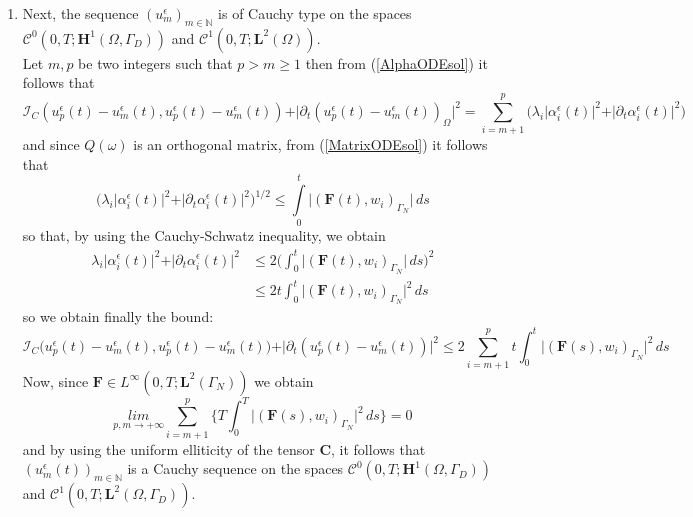 \begin{enumerate}
    \item Next, the sequence $(u^{\epsilon}_m)_{m \in \mathbb{N}}$ is of Cauchy type on the spaces $\mathcal{C}^0(0,T;\mathbf{H}^1(\Omega, \Gamma_D))$ and $\mathcal{C}^1(0,T; \mathbf{L}^2(\Omega))$.\\
    Let $m,p$ be two integers such that $p > m \geq 1$ then from (\ref{AlphaODEsol}) it follows that
    \begin{equation*}
        \mathcal{I}_C(u_p^{\epsilon}(t)- u_m^{\epsilon}(t),u_p^{\epsilon}(t)- u_m^{\epsilon}(t)) + \vert \partial_t (u_p^{\epsilon}(t)- u_m^{\epsilon}(t))_{\Omega} \vert^2 = \sum_{i=m+1}^p \big( \lambda_i \vert \alpha_i^{\epsilon}(t) \vert^2 + \vert \partial_t \alpha_i^{\epsilon}(t) \vert^2 \big) 
    \end{equation*}
    and since $Q(\omega)$ is an orthogonal matrix, from (\ref{MatrixODEsol}) it follows that
    \begin{equation}
        \label{AlphaBound}
        \big( \lambda_i \vert \alpha_i^{\epsilon}(t) \vert^2 + \vert \partial_t \alpha_i^{\epsilon}(t) \vert^2 \big)^{1/2} \leq \int \limits_0^t \vert (\mathbf{F}(t),w_i)_{\Gamma_N} \vert \, ds 
    \end{equation}
    so that, by using the Cauchy-Schwatz inequality, we obtain
    \begin{align*}
        \lambda_i \vert \alpha_i^{\epsilon}(t) \vert^2 + \vert \partial_t \alpha_i^{\epsilon}(t) \vert^2 &\leq 2 \big( \int_0^t \vert (\mathbf{F}(t),w_i)_{\Gamma_N} \vert \, ds \big)^2 \\
        & \leq  2 t \int_0^t \vert (\mathbf{F}(t),w_i)_{\Gamma_N} \vert^2 \, ds
    \end{align*}
    so we obtain finally the bound:
    \begin{equation*}
        \mathcal{I}_C \big(u_p^{\epsilon}(t) - u_m^{\epsilon}(t),u_p^{\epsilon}(t) - u_m^{\epsilon}(t) \big) + \vert \partial_t (u_p^{\epsilon}(t) - u_m^{\epsilon}(t)) \vert^2 \leq 2 \sum_{i=m+1}^p t \int_0^t \vert (\mathbf{F}(s),w_i)_{\Gamma_N} \vert^2 \, ds
    \end{equation*}
    Now, since $\mathbf{F} \in L^{\infty}(0,T;\mathbf{L}^2( \Gamma_N))$ we obtain
    \begin{equation*}
        \underset{p,m \longrightarrow + \infty}{lim} \sum_{i=m+1}^p \big \{ T \int_0^T \vert (\mathbf{F}(s),w_i)_{\Gamma_N}\vert^2 \, ds \big \} = 0
    \end{equation*}
    and by using the uniform elliticity of the tensor $\mathbf{C}$, it follows that $(u_m^{\epsilon}(t))_{m \in \mathbb{N}}$ is a Cauchy sequence on the spaces $\mathcal{C}^0(0,T; \mathbf{H}^1(\Omega, \Gamma_D))$ and $\mathcal{C}^1(0,T; \mathbf{L}^2(\Omega, \Gamma_D))$.
    

\end{enumerate}

